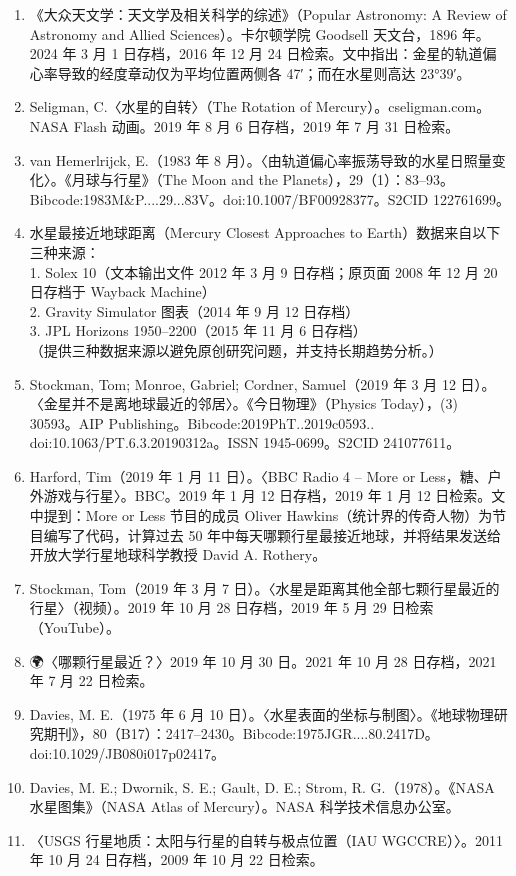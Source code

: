 \begin{enumerate}
    \item 《大众天文学：天文学及相关科学的综述》（Popular Astronomy: A Review of Astronomy and Allied Sciences）。卡尔顿学院 Goodsell 天文台，1896 年。2024 年 3 月 1 日存档，2016 年 12 月 24 日检索。文中指出：金星的轨道偏心率导致的经度章动仅为平均位置两侧各 47′；而在水星则高达 23°39′。
    \item Seligman, C.〈水星的自转〉（The Rotation of Mercury）。cseligman.com。NASA Flash 动画。2019 年 8 月 6 日存档，2019 年 7 月 31 日检索。
    \item van Hemerlrijck, E.（1983 年 8 月）。〈由轨道偏心率振荡导致的水星日照量变化〉。《月球与行星》（The Moon and the Planets），29（1）：83–93。Bibcode:1983M&P....29...83V。doi:10.1007/BF00928377。S2CID 122761699。
    \item 水星最接近地球距离（Mercury Closest Approaches to Earth）数据来自以下三种来源：\\
    1. Solex 10（文本输出文件 2012 年 3 月 9 日存档；原页面 2008 年 12 月 20 日存档于 Wayback Machine）\\
    2. Gravity Simulator 图表（2014 年 9 月 12 日存档）\\
    3. JPL Horizons 1950–2200（2015 年 11 月 6 日存档）\\
   （提供三种数据来源以避免原创研究问题，并支持长期趋势分析。）
    \item Stockman, Tom; Monroe, Gabriel; Cordner, Samuel（2019 年 3 月 12 日）。〈金星并不是离地球最近的邻居〉。《今日物理》（Physics Today），(3) 30593。AIP Publishing。Bibcode:2019PhT..2019c0593.. doi:10.1063/PT.6.3.20190312a。ISSN 1945-0699。S2CID 241077611。
    \item Harford, Tim（2019 年 1 月 11 日）。〈BBC Radio 4 – More or Less，糖、户外游戏与行星〉。BBC。2019 年 1 月 12 日存档，2019 年 1 月 12 日检索。文中提到：More or Less 节目的成员 Oliver Hawkins（统计界的传奇人物）为节目编写了代码，计算过去 50 年中每天哪颗行星最接近地球，并将结果发送给开放大学行星地球科学教授 David A. Rothery。
    \item Stockman, Tom（2019 年 3 月 7 日）。〈水星是距离其他全部七颗行星最近的行星〉（视频）。2019 年 10 月 28 日存档，2019 年 5 月 29 日检索（YouTube）。
    \item 🌍〈哪颗行星最近？〉2019 年 10 月 30 日。2021 年 10 月 28 日存档，2021 年 7 月 22 日检索。
    \item Davies, M. E.（1975 年 6 月 10 日）。〈水星表面的坐标与制图〉。《地球物理研究期刊》，80（B17）：2417–2430。Bibcode:1975JGR....80.2417D。doi:10.1029/JB080i017p02417。
    \item Davies, M. E.; Dwornik, S. E.; Gault, D. E.; Strom, R. G.（1978）。《NASA 水星图集》（NASA Atlas of Mercury）。NASA 科学技术信息办公室。
    \item 〈USGS 行星地质：太阳与行星的自转与极点位置（IAU WGCCRE）〉。2011 年 10 月 24 日存档，2009 年 10 月 22 日检索。


\end{enumerate}
